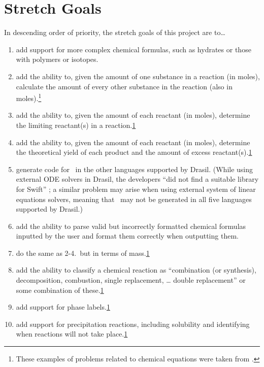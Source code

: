 \documentclass{article}
\begin{document}
\section{Stretch Goals}

In descending order of priority, the stretch goals of this project are to\dots

\begin{enumerate}
	\item add support for more complex chemical formulas, such as hydrates or
	      those with polymers or isotopes.
	\item add the ability to, given the amount of one substance in a reaction
	      (in moles), calculate the amount of every other substance in the
	      reaction (also in moles).\footnote{\label{chemProbExs}These examples
		      of problems related to chemical equations were taken from
		      \cite{lund_introduction_2023}.}
	\item add the ability to, given the amount of each reactant (in moles),
	      determine the limiting reactant(s) in a reaction.\cref{chemProbExs}
	\item add the ability to, given the amount of each reactant (in moles),
	      determine the theoretical yield of each product and the amount of
	      excess reactant(s).\cref{chemProbExs}
	\item generate code for \progname~in the other languages supported by
	      Drasil. (While using external ODE solvers in Drasil, the developers
	      ``did not find a suitable library for Swift''
	      \cite[p.~24]{chen_solving_2022}; a similar problem may arise when
	      using external system of linear equations solvers,
	      meaning that \progname~may not be generated in all five languages
	      supported by Drasil.)
	\item add the ability to parse valid but incorrectly formatted chemical
	      formulas inputted by the user and format them correctly when
	      outputting them.
	\item do the same as 2-4.~but in terms of mass.\cref{chemProbExs}
	\item add the ability to classify a chemical reaction as ``combination (or
	      synthesis), decomposition, combustion, single replacement, \dots
	      double replacement'' \cite[p.~301]{lund_introduction_2023} or some
	      combination of these.\cref{chemProbExs}
	\item add support for phase labels.\cref{chemProbExs}
	\item add support for precipitation reactions, including solubility and
	      identifying when reactions will not take place.\cref{chemProbExs}
\end{enumerate}

\newpage



\end{document}
